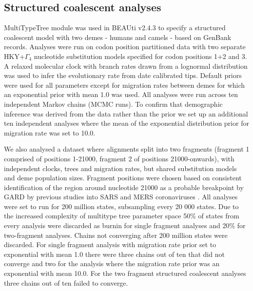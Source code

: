 \documentclass[11pt,oneside,letterpaper]{article}
\begin{document}
\subsection*{Structured coalescent analyses}

MultiTypeTree module \citep{vaughan_efficient_2014} was used in BEAUti v2.4.3 \citep{bouckaert_beast_2014} to specify a structured coalescent model with two demes - humans and camels - based on GenBank records.
Analyses were run on codon position partitioned data with two separate HKY+$\Gamma_{4}$ \citep{hky_1985,yang_1994} nucleotide substitution models specified for codon positions 1+2 and 3.
A relaxed molecular clock with branch rates drawn from a lognormal distribution \citep{drummond_2006} was used to infer the evolutionary rate from date calibrated tips.
Default priors were used for all parameters except for migration rates between demes for which an exponential prior with mean 1.0 was used.
All analyses were run across ten independent Markov chains (MCMC runs).
To confirm that demographic inference was derived from the data rather than the prior we set up an additional ten independent analyses where the mean of the exponential distribution prior for migration rate was set to 10.0.

We also analysed a dataset where alignments split into two fragments (fragment 1 comprised of positions 1-21000, fragment 2 of positions 21000-onwards), with independent clocks, trees and migration rates, but shared substitution models and deme population sizes.
Fragment positions were chosen based on consistent identification of the region around nucleotide 21000 as a probable breakpoint by GARD \citep{pond_gard:_2006} by previous studies into SARS and MERS coronaviruses \citep{hon_evidence_2008,dudas_mers-cov_2016}.
All analyses were set to run for 200 million states, subsampling every 20 000 states.
Due to the increased complexity of multitype tree parameter space 50\% of states from every analysis were discarded as burnin for single fragment analyses and 20\% for two-fragment analyses.
Chains not converging after 200 million states were discarded.
For single fragment analysis with migration rate prior set to exponential with mean 1.0 there were three chains out of ten that did not converge and two for the analysis where the migration rate prior was an exponential with mean 10.0.
For the two fragment structured coalescent analyses three chains out of ten failed to converge.
\end{document}
